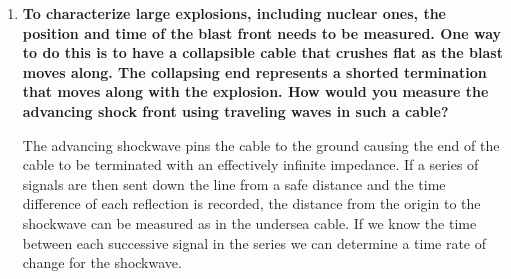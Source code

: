 \begin{enumerate}[resume]
\begin{enumerate}[label=\Alph*)]
\item {\bf To characterize large explosions, including nuclear ones, the position and time of the blast front needs to be measured. One way to do this is to have a collapsible cable that crushes flat as the blast moves along. The collapsing end represents a shorted termination that moves along with the explosion. How would you measure the advancing shock front using traveling waves in such a cable?}\newline

The advancing shockwave pins the cable to the ground causing the end of the cable to be terminated with an effectively infinite impedance. If a series of signals are then sent down the line from a safe distance and the time difference of each reflection is recorded, the distance from the origin to the shockwave can be measured as in the undersea cable. If we know the time between each successive signal in the series we can determine a time rate of change for the shockwave.

\end{enumerate}

\end{enumerate}



\AtEndDocument{\clearpage\ifodd\value{page}\else\null\clearpage\fi} %


